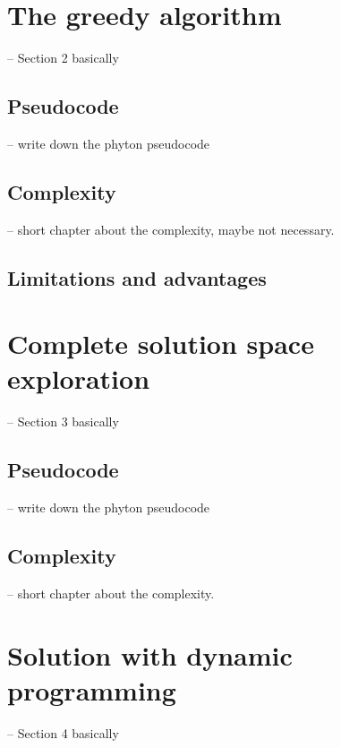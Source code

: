 \documentclass[parskip=full]{scrartcl}
\begin{document}
\section{The greedy algorithm}
-- Section 2 basically

\subsection{Pseudocode}
-- write down the phyton pseudocode

\subsection{Complexity}
-- short chapter about the complexity, maybe not necessary.

\subsection{Limitations and advantages}


\section{Complete solution space exploration}
-- Section 3 basically

\subsection{Pseudocode}
-- write down the phyton pseudocode

\subsection{Complexity}
-- short chapter about the complexity.



\section{Solution with dynamic programming}
-- Section 4 basically
\end{document}
